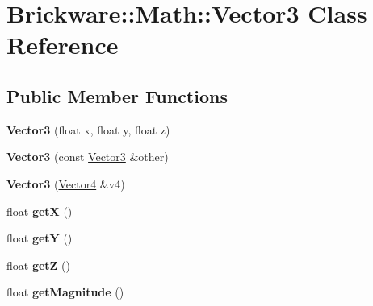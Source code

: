 \hypertarget{classBrickware_1_1Math_1_1Vector3}{}\section{Brickware\+:\+:Math\+:\+:Vector3 Class Reference}
\label{classBrickware_1_1Math_1_1Vector3}
\subsection*{Public Member Functions}
\begin{DoxyCompactItemize}
\item 
\hypertarget{classBrickware_1_1Math_1_1Vector3_ad53e22b52babdb90d423601f72467590}{}{\bfseries Vector3} (float x, float y, float z)\label{classBrickware_1_1Math_1_1Vector3_ad53e22b52babdb90d423601f72467590}

\item 
\hypertarget{classBrickware_1_1Math_1_1Vector3_aad6b7d343e46f9d930139ebf3195a886}{}{\bfseries Vector3} (const \hyperlink{classBrickware_1_1Math_1_1Vector3}{Vector3} \&other)\label{classBrickware_1_1Math_1_1Vector3_aad6b7d343e46f9d930139ebf3195a886}

\item 
\hypertarget{classBrickware_1_1Math_1_1Vector3_a68ed7a399edfefed57301279f5b944d1}{}{\bfseries Vector3} (\hyperlink{classBrickware_1_1Math_1_1Vector4}{Vector4} \&v4)\label{classBrickware_1_1Math_1_1Vector3_a68ed7a399edfefed57301279f5b944d1}

\item 
\hypertarget{classBrickware_1_1Math_1_1Vector3_a5861be669a169eafccecc09d8e4916b5}{}float {\bfseries get\+X} ()\label{classBrickware_1_1Math_1_1Vector3_a5861be669a169eafccecc09d8e4916b5}

\item 
\hypertarget{classBrickware_1_1Math_1_1Vector3_ab24be51ba4d06401f1b8c58578f4713f}{}float {\bfseries get\+Y} ()\label{classBrickware_1_1Math_1_1Vector3_ab24be51ba4d06401f1b8c58578f4713f}

\item 
\hypertarget{classBrickware_1_1Math_1_1Vector3_a4440fcca47a74910ccc78c9653d03481}{}float {\bfseries get\+Z} ()\label{classBrickware_1_1Math_1_1Vector3_a4440fcca47a74910ccc78c9653d03481}

\item 
\hypertarget{classBrickware_1_1Math_1_1Vector3_a54b8f55a970ee252479a326ffd0699c0}{}float {\bfseries get\+Magnitude} ()\label{classBrickware_1_1Math_1_1Vector3_a54b8f55a970ee252479a326ffd0699c0}


\end{DoxyCompactItemize}
